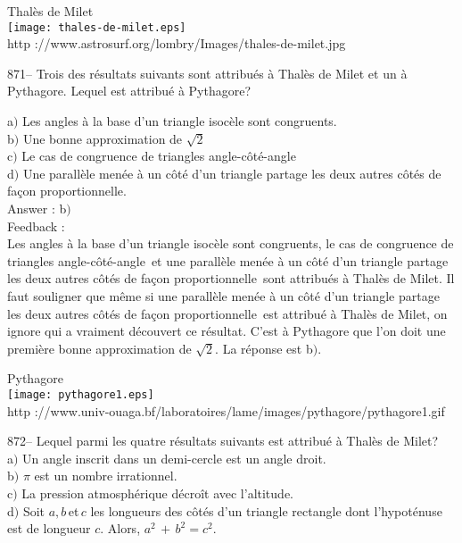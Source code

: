 \documentclass[letterpaper, 12pt]{article}
\begin{document}
        \begin{center}
        Thal\`es de Milet\\
    \texttt{[image: thales-de-milet.eps]}\\
        {\footnotesize http
://www.astrosurf.org/lombry/Images/thales-de-milet.jpg}
    \end{center}

871-- Trois des r\'esultats suivants sont attribu\'es \`a Thal\`es
de Milet et un \`a Pythagore. Lequel est attribu\'e \`a Pythagore?

a$)$ Les angles \`a la base d'un triangle isoc\`ele sont congruents. \\
b$)$ Une bonne approximation de $\sqrt2$ \\
c$)$ Le cas de congruence de triangles angle-c\^ot\'e-angle \\
d$)$ Une parall\`ele men\'ee \`a un c\^ot\'e d'un triangle partage les deux
autres c\^ot\'es de fa\c con proportionnelle. \\

Answer : b$)$\\

Feedback : \\
\og Les angles \`a la base d'un triangle isoc\`ele sont
congruents\fg , \og le cas de congruence de triangles
angle-c\^ot\'e-angle\fg\ et \og une parall\`ele men\'ee \`a un
c\^ot\'e d'un triangle partage les deux autres c\^ot\'es de fa\c con
proportionnelle\fg\ sont attribu\'es \`a Thal\`es de Milet.  Il faut
souligner que m\^eme si \og une parall\`ele men\'ee \`a un c\^ot\'e
d'un triangle partage les deux autres c\^ot\'es de fa\c con
proportionnelle\fg\ est attribu\'e \`a Thal\`es de Milet, on ignore
qui a vraiment d\'ecouvert ce r\'esultat. C'est \`a Pythagore que
l'on doit une premi\`ere bonne approximation de $\sqrt2$. La
r\'eponse est b$)$.

        \begin{center}
        Pythagore\\
    \texttt{[image: pythagore1.eps]}\\
        {\footnotesize http
://www.univ-ouaga.bf/laboratoires/lame/images/pythagore/pythagore1.gif}
    \end{center}

872-- Lequel parmi les quatre r\'esultats suivants est attribu\'e \`a
Thal\`es de Milet?\\

a$)$ Un angle inscrit dans un demi-cercle est un angle droit. \\
b$)$ $\pi$ est un nombre irrationnel. \\
c$)$ La pression atmosph\'erique d\'ecro\^it avec l'altitude. \\
d$)$ Soit $a,b\,$et$\,c$ les longueurs des c\^ot\'es d'un triangle rectangle
dont l'hypot\'enuse est de longueur $c$.  Alors, $a^2\,+\,b^2=c^2$.\\
\end{document}
